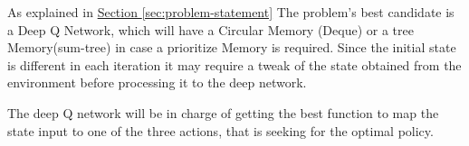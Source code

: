 As explained in \hyperref[sec:problem-statement]{Section
\ref*{sec:problem-statement}} The problem's best candidate is a Deep Q Network, which will have a Circular Memory (Deque) or a tree Memory(sum-tree) in case a prioritize Memory is required. Since the initial state is different in each iteration it may require a tweak of the state obtained from the environment before processing it to the deep network. 

The deep Q network will be in charge of getting the best function to map the state input to one of the three actions, that is seeking for the optimal policy.